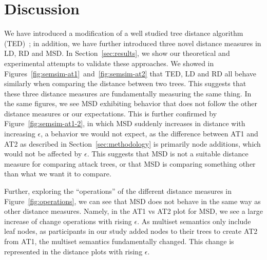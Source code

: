 \section{Discussion}
\label{sec:dicsussion}








We have introduced a modification of a well studied tree distance algorithm (TED)~\cite{Zhang_Shasha_1989}; in addition, we have further introduced three novel distance measures in LD, RD and MSD. In Section~\ref{sec:results}, we show our theoretical and experimental attempts to validate these approaches. We showed in Figures~\ref{fig:semsim-at1}~and~\ref{fig:semsim-at2} that TED, LD and RD all behave similarly when comparing the distance between two trees. This suggests that these three distance measures are fundamentally measuring the same thing. In the same figures, we see MSD exhibiting behavior that does not follow the other distance measures or our expectations. This is further confirmed by Figure~\ref{fig:semsim-at1-2}, in which MSD suddenly increases in distance with increasing $\epsilon$, a behavior we would not expect, as the difference between AT1 and AT2 as described in Section~\ref{sec:methodology} is primarily node additions, which would not be affected by $\epsilon$. This suggests that MSD is not a suitable distance measure for comparing attack trees, or that MSD is comparing something other than what we want it to compare.

Further, exploring the ``operations'' of the different distance measures in Figure~\ref{fig:operations}, we can see that MSD does not behave in the same way as other distance measures. Namely, in the AT1 vs AT2 plot for MSD, we see a large increase of change operations with rising $\epsilon$. As multiset semantics only include leaf nodes, as participants in our study added nodes to their trees to create AT2 from AT1, the multiset semantics fundamentally changed. This change is represented in the distance plots with rising $\epsilon$.

